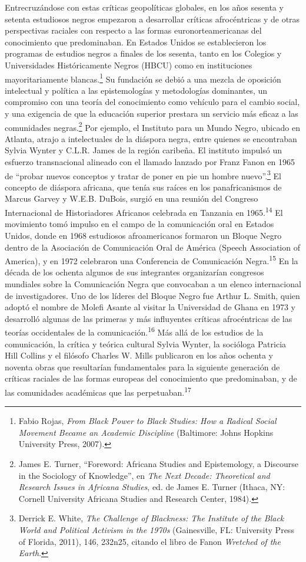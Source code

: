 \documentclass{tufte-handout}
\begin{document}
Entrecruzándose con estas críticas geopolíticas globales, en los años
sesenta y setenta estudiosos negros empezaron a desarrollar críticas
afrocéntricas y de otras perspectivas raciales con respecto a las formas
euronorteamericanas del conocimiento que predominaban. En Estados Unidos
se establecieron los programas de estudios negros a finales de los
sesenta, tanto en los Colegios y Universidades Históricamente Negros
(HBCU) como en instituciones mayoritariamente blancas.\footnote{Fabio
  Rojas, \emph{From Black Power to Black Studies: How a Radical Social
  Movement Became an Academic Discipline} (Baltimore: Johns Hopkins
  University Press, 2007).} Su fundación se debió a una mezcla de
oposición intelectual y política a las epistemologías y metodologías
dominantes, un compromiso con una teoría del conocimiento como vehículo
para el cambio social, y una exigencia de que la educación superior
prestara un servicio más eficaz a las comunidades negras.\footnote{James
  E. Turner, ``Foreword: Africana Studies and Epistemology, a Discourse
  in the Sociology of Knowledge'', en \emph{The Next Decade: Theoretical
  and Research Issues in Africana Studies}, ed. de James E. Turner
  (Ithaca, NY: Cornell University Africana Studies and Research Center,
  1984).} Por ejemplo, el Instituto para un Mundo Negro, ubicado en
Atlanta, atrajo a intelectuales de la diáspora negra, entre quienes se
encontraban Sylvia Wynter y C.L.R. James de la región caribeña. El
instituto impulsó un esfuerzo transnacional alineado con el llamado
lanzado por Franz Fanon en 1965 de ``probar nuevos conceptos y tratar de
poner en pie un hombre nuevo''.\footnote{Derrick E. White, \emph{The
  Challenge of Blackness: The Institute of the Black World and Political
  Activism in the 1970s} (Gainesville, FL: University Press of Florida,
  2011), 146, 232n25, citando el libro de Fanon \emph{Wretched of the
  Earth}.} El concepto de diáspora africana, que tenía sus raíces en los
panafricanismos de Marcus Garvey y W.E.B. DuBois, surgió en una reunión
del Congreso Internacional de Historiadores Africanos celebrada en
Tanzania en 1965.\textsuperscript{14} El movimiento
tomó impulso en el campo de la comunicación oral en Estados Unidos,
donde en 1968 estudiosos afroamericanos formaron un Bloque Negro dentro
de la Asociación de Comunicación Oral de América (Speech Association of
America), y en 1972 celebraron una Conferencia de Comunicación
Negra.\textsuperscript{15} En la década de
los ochenta algunos de sus integrantes organizarían congresos mundiales
sobre la Comunicación Negra que convocaban a un elenco internacional de
investigadores. Uno de los líderes del Bloque Negro fue Arthur L. Smith,
quien adoptó el nombre de Molefi Asante al visitar la Universidad de
Ghana en 1973 y desarrolló algunas de las primeras y más influyentes
críticas afrocéntricas de las teorías occidentales de la
comunicación.\textsuperscript{16} Más
allá de los estudios de la comunicación, la crítica y teórica cultural
Sylvia Wynter, la socióloga Patricia Hill Collins y el filósofo Charles
W. Mills publicaron en los años ochenta y noventa obras que resultarían
fundamentales para la siguiente generación de críticas raciales de las
formas europeas del conocimiento que predominaban, y de las comunidades
académicas que las perpetuaban.\textsuperscript{17}
\end{document}
